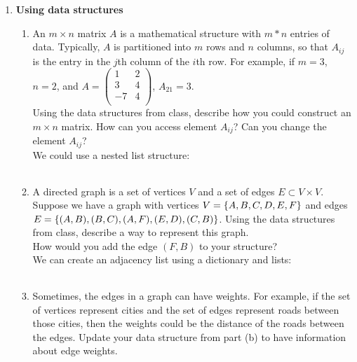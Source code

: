 \documentclass{article}
\begin{document}
\pagestyle{fancy}
\begin{enumerate}

\item \textbf{Using data structures}
\begin{enumerate}
\item An $m \times n$ matrix $A$ is a mathematical structure with $m * n$ entries of data.  Typically, $A$ is partitioned into $m$ rows and $n$ columns, so that $A_{ij}$ is the entry in the $j$th column of the $i$th row.  For example, if $m = 3$, $n = 2$, and $A = \begin{pmatrix} 1 & 2 \\ 3 & 4 \\ -7 & 4 \\ \end{pmatrix}$, $A_{21} = 3$. \\

Using the data structures from class, describe how you could construct an $m \times n$ matrix.  How can you access element $A_{ij}$?  Can you change the element $A_{ij}$? \\

We could use a nested list structure: \\
\begin{tabular}{c}

\end{tabular}
\end{enumerate}

\begin{enumerate}
\setcounter{enumii}{1}
\item A directed graph is a set of vertices $V$ and a set of edges $E \subset V \times V$.  Suppose we have a graph with vertices $V = \{A, B, C, D, E, F\}$ and edges $E = \{(A, B), (B, C), (A, F), (E, D), (C, B)\}$.  Using the data structures from class, describe a way to represent this graph. \\

How would you add the edge $(F, B)$ to your structure? \\

We can create an adjacency list using a dictionary and lists: \\
\begin{tabular}{c}

\end{tabular}
\end{enumerate}

\begin{enumerate}
\setcounter{enumii}{2}
\item Sometimes, the edges in a graph can have weights.  For example, if the set of vertices represent cities and the set of edges represent roads between those cities, then the weights could be the distance of the roads between the edges. Update your data structure from part (b) to have information about edge weights. \\


\end{enumerate}
\end{enumerate}
\end{document}
